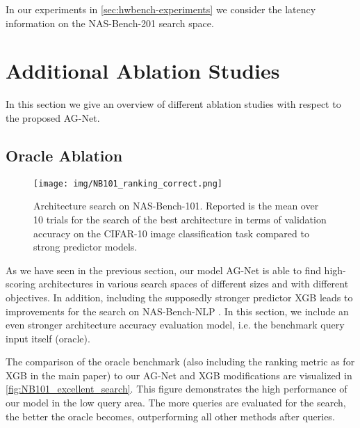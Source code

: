 \documentclass[runningheads]{llncs}
\begin{document}
In our experiments in \autoref{sec:hwbench-experiments} we consider the latency information on the NAS-Bench-201 search space.

\section{Additional Ablation Studies}
\label{supp:sec_ablation}

In this section we give an overview of different ablation studies with respect to the proposed AG-Net.
\subsection{Oracle Ablation}\label{supp:sec_push}
\begin{figure}
	\centering
	\texttt{[image: img/NB101\_ranking\_correct.png]}
	\caption{Architecture search on NAS-Bench-101. Reported is the mean over 10 trials for the search of the best architecture in terms of validation accuracy on the CIFAR-10 image classification task compared to strong predictor models.
		\label{fig:NB101_excellent_search}}
\end{figure}
As we have seen in the previous section, our model AG-Net is able to find high-scoring architectures in various search spaces of different sizes and with different objectives.
In addition, including the supposedly stronger predictor XGB \cite{XGB} leads to improvements for the search on NAS-Bench-NLP \cite{2020NBNLP}.
In this section, we include an even stronger architecture accuracy evaluation model, i.e. the benchmark query input itself (oracle).

The comparison of the oracle benchmark (also including the ranking metric as for XGB in the main paper) to our AG-Net and XGB modifications are visualized in \autoref{fig:NB101_excellent_search}.
This figure demonstrates the high performance of our model in the low query area.
The more queries are evaluated for the search, the better the oracle becomes, outperforming all other methods after  queries.
\end{document}
